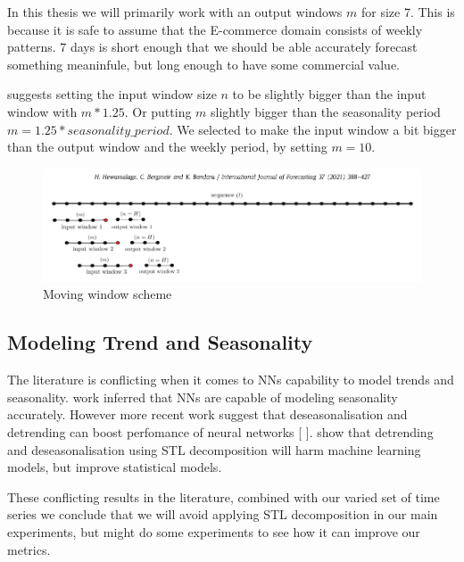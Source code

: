 In this thesis we will primarily work with an output windows $m$ for size 7.
This is because it is safe to assume that the E-commerce domain consists of weekly patterns.
7 days is short enough that we should be able accurately forecast something meaninfule,
but long enough to have some commercial value.

\cite{Hewamalage2021} suggests setting the input window size $n$ to be slightly
bigger than the input window with $m * 1.25$. Or putting $m$ slightly bigger than
the seasonality period $m = 1.25 * seasonality\_period$.
We selected to make the input window a bit bigger than the output window and the weekly
period, by setting $m = 10$.
\begin{figure}[h!]
  \centering
  \includegraphics[width=\textwidth]{./figs/illustrations/moving_window_illustration.png}
  \hfill
  \caption{Moving window scheme \citep{Hewamalage2021}}
  \label{fig:dataset:moving_window_scheme}
\end{figure}



\subsection{Modeling Trend and Seasonality}
The literature is conflicting when it comes to NNs capability to
model trends and seasonality. \cite{Sharda1992} work inferred that NNs are
capable of modeling seasonality accurately.
However more recent work suggest that deseasonalisation and
detrending can boost perfomance of neural networks [\cite{Zhang2005} \cite{Smyl2020}].
\cite{Ouyang2021} show that detrending and deseasonalisation using STL decomposition
will harm machine learning models, but improve statistical models.

These conflicting results in the literature, combined with our varied set of time series
we conclude that we will avoid applying STL decomposition in our main experiments,
but might do some experiments to see how it can improve our metrics.


